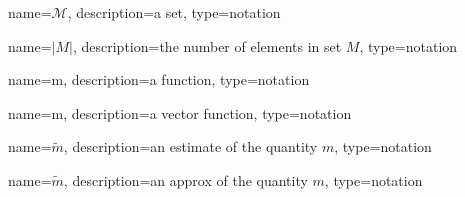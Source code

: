 	\newcommand{\set}[1]{\ensuremath{\mathcal{#1}}}
	{%
		name=\set{M},
		description=a set,
		type=notation
	}

	\newcommand{\cardinality}[1]{\ensuremath{\left|#1\right|}}
	{%
		name=\cardinality{M},
		description=the number of elements in set $M$,
		type=notation
	}

	\newcommand{\func}[1]{\ensuremath{\mathrm{#1}}}
	{%
		name=\func{m},
		description=a function,
		type=notation
	}

	\newcommand{\vecfunc}[1]{\ensuremath{\boldsymbol{\mathrm{#1}}}}
	{%
		name=\vecfunc{m},
		description=a vector function,
		type=notation
	}

	\newcommand{\estimate}[1]{\ensuremath{\widetilde{#1}}}
	{%
		name=\estimate{m},
		description=an estimate of the quantity $m$,
		type=notation
	}

	\newcommand{\approximation}[1]{\ensuremath{\widetilde{#1}}}
	{%
		name=\approximation{m},
		description=an approx of the quantity $m$,
		type=notation
	}

